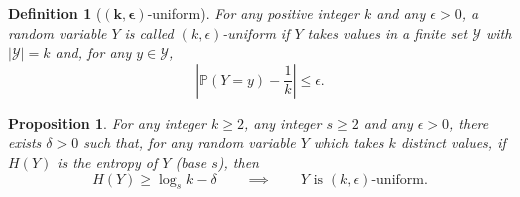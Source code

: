 \documentclass{birkjour}
\newtheorem{prop}[thm]{Proposition}
\theoremstyle{indenteddefinition}
\newtheorem{defn}[thm]{Definition}
\theoremstyle{indenteddefinition}
\numberwithin{equation}{section}
\renewcommand{\P}{\mathbb{P}}
\begin{document}
\begin{defn}[$\mathbf{(k,\boldsymbol{\epsilon})}$-uniform]
\label{defn:(k,e)-uniform} 
For any positive integer $k$ and any $\epsilon >0$, a random variable $Y$ is called $(k,\epsilon)$-uniform if $Y$ takes values in a finite set $\mathcal{Y}$ with $|\mathcal{Y}| = k$ and, for any $y \in \mathcal{Y}$,
	$$ \left| \P(Y=y) - \frac{1}{k} \right| \leq \epsilon .$$

\end{defn}

\begin{prop}
\label{prop:delta}
For any integer $k \geq 2$, any integer $s \geq 2$ and any $\epsilon >0$, there exists $\delta >0$ such that, for any random variable $Y$ which takes $k$ distinct values, if $H(Y)$ is the entropy of $Y$ (base $s$), then 
	$$ H(Y) \geq \log_s k - \delta \qquad \implies \qquad Y \mbox{ is $(k,\epsilon)$-uniform.} $$
\end{prop}
\end{document}
